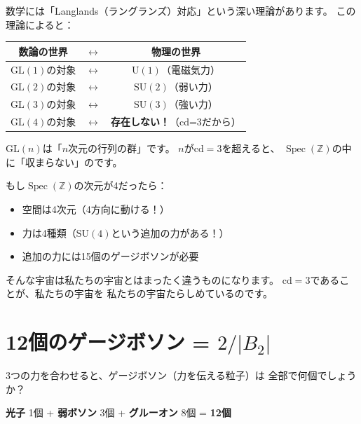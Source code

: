 \documentclass[12pt,a4paper]{article}
\newcommand{\Spec}{\operatorname{Spec}}
\begin{document}
\begin{mathbox}
数学には「Langlands（ラングランズ）対応」という深い理論があります。
この理論によると：

\begin{center}
\begin{tabular}{ccc}
\toprule
数論の世界 & $\longleftrightarrow$ & 物理の世界 \\
\midrule
$\mathrm{GL}(1)$の対象 & $\longleftrightarrow$ & $\mathrm{U}(1)$（電磁気力） \\
$\mathrm{GL}(2)$の対象 & $\longleftrightarrow$ & $\mathrm{SU}(2)$（弱い力） \\
$\mathrm{GL}(3)$の対象 & $\longleftrightarrow$ & $\mathrm{SU}(3)$（強い力） \\
$\mathrm{GL}(4)$の対象 & $\longleftrightarrow$ & \textbf{存在しない！}（cd=3だから） \\
\bottomrule
\end{tabular}
\end{center}

$\mathrm{GL}(n)$は「$n$次元の行列の群」です。
$n$が$\mathrm{cd} = 3$を超えると、
$\Spec(\mathbb{Z})$の中に「収まらない」のです。
\end{mathbox}

\begin{wowbox}[もしcd = 4だったら？]
もし$\Spec(\mathbb{Z})$の次元が4だったら：
\begin{itemize}
  \item 空間は4次元（4方向に動ける！）
  \item 力は4種類（$\mathrm{SU}(4)$という追加の力がある！）
  \item 追加の力には15個のゲージボソンが必要
\end{itemize}
そんな宇宙は私たちの宇宙とはまったく違うものになります。
$\mathrm{cd} = 3$であることが、私たちの宇宙を
私たちの宇宙たらしめているのです。
\end{wowbox}

\section{12個のゲージボソン = $2/|B_2|$}

\begin{keyidea}[力の担い手の数]
3つの力を合わせると、ゲージボソン（力を伝える粒子）は
全部で何個でしょうか？

\begin{center}
\textbf{光子} 1個 + \textbf{弱ボソン} 3個 + \textbf{グルーオン} 8個 = \textbf{12個}
\end{center}
\end{keyidea}
\end{document}

